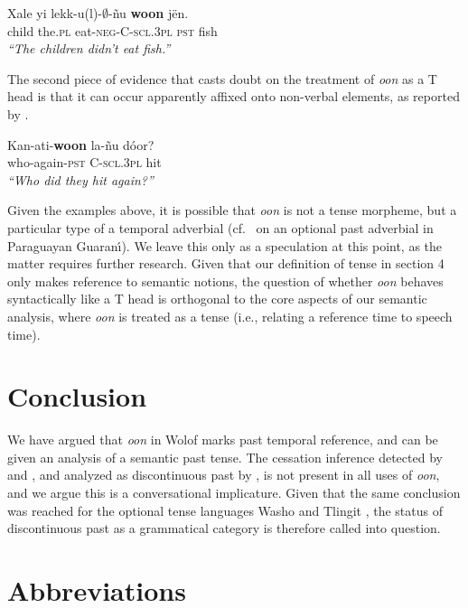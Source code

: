 \documentclass[output=paper
,modfonts
,nonflat]{langsci/langscibook}
\begin{document}
\ea
\gll Xale yi lekk-{u(l)}-$\emptyset$-\~nu \textbf{woon} j\"en.\\
child the.\textsc{pl} eat-\textsc{neg-C-scl.3pl} \textsc{pst} fish\\
\glt \textit{``The children didn't eat fish.''}\label{neg}
\z


The second piece of evidence that casts doubt on the treatment of 
\textit{oon} as a T head is that it can occur apparently affixed onto
non-verbal elements, as reported by \cite{torrence12clause}. 

\ea
\gll Kan-ati-\textbf{woon} la-\~nu d\'oor?\\
who-again-\textsc{pst} C-\textsc{scl.3pl} hit\\
\glt \textit{``Who did they hit again?''}\hfill\citep[p.24]{torrence12clause}
\z

Given the examples above, it is possible that \textit{oon} is not a
tense morpheme, but a particular type of a temporal adverbial (cf.~\citealt{tonhauser06temporal} on an optional past adverbial in Paraguayan Guaran\'\i). We
leave this only as a speculation at this point, as the matter requires
further research. Given that our definition of tense in section 4 only makes reference to semantic notions, the question of whether \textit{oon} behaves syntactically like a T head is orthogonal to the core aspects of our semantic analysis, where \textit{oon} is treated as a tense (i.e., relating a reference time to speech time).


\section{Conclusion}

We have argued that \textit{oon} in Wolof marks past temporal reference, and can be given an analysis of a semantic past tense. The cessation inference detected by \citet{church81systeme} and
\citet{robert91approche}, and analyzed as discontinuous past by
\citet{plungian06towards}, is not present in all uses of \textit{oon},
and we argue this is a conversational implicature. Given that the same conclusion was reached for the optional tense languages Washo \citep{bochnak16past} and Tlingit \citep{cable16implicatures}, the status of discontinuous past as a grammatical category is therefore called into question. 


\section*{Abbreviations}
\end{document}
